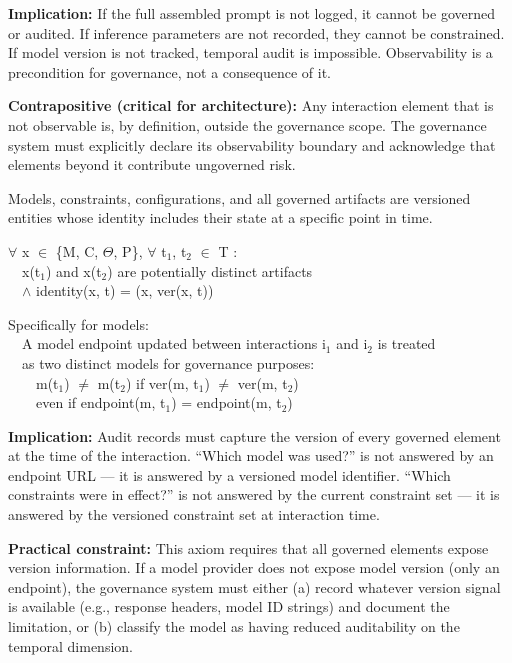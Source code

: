 \textbf{Implication:} If the full assembled prompt is not logged, it cannot be governed or audited. If inference parameters are not recorded, they cannot be constrained. If model version is not tracked, temporal audit is impossible. Observability is a precondition for governance, not a consequence of it.

\textbf{Contrapositive (critical for architecture):} Any interaction element that is not observable is, by definition, outside the governance scope. The governance system must explicitly declare its observability boundary and acknowledge that elements beyond it contribute ungoverned risk.

\begin{caxiom}

Models, constraints, configurations, and all governed artifacts are versioned entities whose identity includes their state at a specific point in time.

\begin{claddisp}
$\forall$ x $\in$ \{M, C, $\Theta$, P\}, $\forall$ t$_1$, t$_2$ $\in$ T :\\
~~x(t$_1$) and x(t$_2$) are potentially distinct artifacts\\
~~$\wedge$ identity(x, t) = (x, ver(x, t))
\par\smallskip
Specifically for models:\\
~~A model endpoint updated between interactions i$_1$ and i$_2$ is treated\\
~~as two distinct models for governance purposes:\\
~~~~m(t$_1$) $\neq$ m(t$_2$) if ver(m, t$_1$) $\neq$ ver(m, t$_2$)\\
~~~~even if endpoint(m, t$_1$) = endpoint(m, t$_2$)
\end{claddisp}


\end{caxiom}

\textbf{Implication:} Audit records must capture the version of every governed element at the time of the interaction. ``Which model was used?'' is not answered by an endpoint URL --- it is answered by a versioned model identifier. ``Which constraints were in effect?'' is not answered by the current constraint set --- it is answered by the versioned constraint set at interaction time.

\textbf{Practical constraint:} This axiom requires that all governed elements expose version information. If a model provider does not expose model version (only an endpoint), the governance system must either (a) record whatever version signal is available (e.g., response headers, model ID strings) and document the limitation, or (b) classify the model as having reduced auditability on the temporal dimension.



